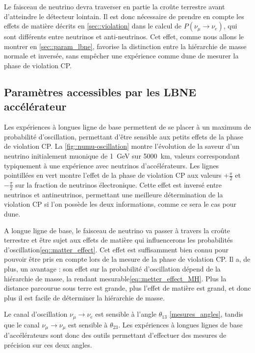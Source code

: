             Le faisceau de neutrino devra traverser en partie la croûte terrestre avant d'atteindre le détecteur lointain. Il est donc nécessaire de prendre en compte les effets de matière décrits en \autoref{sec::violation} dans le calcul de $P(\nu_{\mu}\to \nu_e)$, qui sont différents entre neutrinos et anti-neutrinos. Cet effet, comme nous allons le montrer en \autoref{sec::param_lbne}, favorise la distinction entre la hiérarchie de masse normale et inversée, sans empêcher une expérience comme \gls{dune} de mesurer la phase de violation CP.
        
        \subsection{Paramètres accessibles par les LBNE accélérateur}\label{sec::param_lbne}
            
            Les expériences à longues ligne de base permettent de se placer à un maximum de probabilité d'oscillation, permettant d'être sensible aux petits effets de la phase de violation CP. La \autoref{fig::numu-oscillation} montre l'évolution de la saveur d'un neutrino initialement muonique de \SI{1}{\giga\electronvolt} sur \SI{5000}{\kilo\meter}, valeurs correspondant typiquement à une expérience avec neutrinos d'accélérateurs. Les lignes pointillées en vert montre l'effet de la phase de violation CP aux valeurs $+\frac{\pi}{2}$ et $-\frac{\pi}{2}$ sur la fraction de neutrinos électronique. Cette effet est inversé entre neutrinos et antineutrinos, permettant une meilleure détermination de la violation CP si l'on possède les deux informations, comme ce sera le cas pour \gls{dune}.
            
            A longue ligne de base, le faisceau de neutrino va passer à travers la croûte terrestre et être sujet aux effets de matière qui influencerons les probabilités d'oscillation\eqref{eq::matter_effect}. Cet effet est suffisamment bien connu pour pouvoir être pris en compte lors de la mesure de la phase de violation CP. Il a, de plus, un avantage : son effet sur la probabilité d'oscillation dépend de la hiérarchie de masse, la rendant mesurable\eqref{eq::metter_effect_MH}. Plus la distance parcourue sous terre est grande, plus l'effet de matière est grand, et donc plus il est facile de déterminer la hiérarchie de masse.
            
            Le canal d'oscillation $\nu_{\mu}\to\nu_e$ est sensible à l'angle $\theta_{13}$ \eqref{mesures_angles}, tandis que le canal $\nu_{\mu}\to\nu_{\mu}$ est sensible à $\theta_{23}$. Les expériences à longues lignes de base d'accélérateurs sont donc des outils permettant d'effectuer des mesures de précision sur ces deux angles.
            
